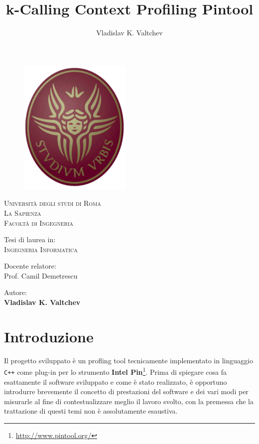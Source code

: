\documentclass[a4paper,11pt]{report}
\author{Vladislav K. Valtchev}
\title{k-Calling Context Profiling Pintool}
\begin{document}
\thispagestyle{empty}

\begin{figure}
\centering
\includegraphics[scale=0.6]{logo}
\end{figure}


\begin{center}


{\Large\textsc{Università degli studi di Roma}\\} 
{\huge\textsc{La Sapienza}\\[10pt]}
{\huge\textsc{Facoltà di Ingegneria}\\[40pt]} 

{\large Tesi di laurea in: \\}
{\LARGE\textsc{Ingegneria Informatica}\\[50pt]}

{\large Docente relatore: \\}
{\large Prof. Camil Demetrescu\\[20pt]}

{\large Autore: \\}
{\large \textbf{Vladislav K. Valtchev}}

\end{center}


\chapter{Introduzione}

Il progetto sviluppato è un profling tool tecnicamente implementato in linguaggio \verb|C++| come plug-in per lo strumento 
\textbf{Intel Pin}\footnote{\url{http://www.pintool.org/}}.
Prima di spiegare cosa fa esattamente il software sviluppato e come è stato realizzato,
è opportuno introdurre brevemente il concetto di prestazioni del software e dei vari modi per misurarle 
al fine di contestualizzare meglio il lavoro svolto, con la premessa che la trattazione di questi temi non è assolutamente esaustiva.
\end{document}
